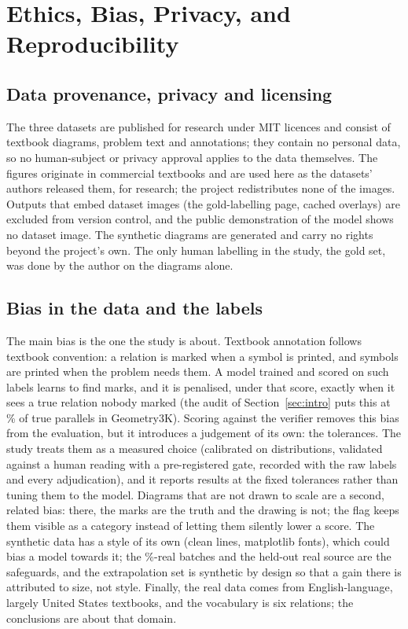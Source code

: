 \section{Ethics, Bias, Privacy, and Reproducibility}
\label{sec:ethics}

\subsection{Data provenance, privacy and licensing}

The three datasets are published for research under MIT licences and consist of textbook diagrams, problem text and annotations; they contain no personal data, so no human-subject or privacy approval applies to the data themselves. The figures originate in commercial textbooks and are used here as the datasets' authors released them, for research; the project redistributes none of the images. Outputs that embed dataset images (the gold-labelling page, cached overlays) are excluded from version control, and the public demonstration of the model shows no dataset image. The synthetic diagrams are generated and carry no rights beyond the project's own. The only human labelling in the study, the gold set, was done by the author on the diagrams alone.

\subsection{Bias in the data and the labels}

The main bias is the one the study is about. Textbook annotation follows textbook convention: a relation is marked when a symbol is printed, and symbols are printed when the problem needs them. A model trained and scored on such labels learns to find marks, and it is penalised, under that score, exactly when it sees a true relation nobody marked (the audit of Section~\ref{sec:intro} puts this at \pctUnmarkedGParallel\% of true parallels in Geometry3K). Scoring against the verifier removes this bias from the evaluation, but it introduces a judgement of its own: the tolerances. The study treats them as a measured choice (calibrated on distributions, validated against a human reading with a pre-registered gate, recorded with the raw labels and every adjudication), and it reports results at the fixed tolerances rather than tuning them to the model. Diagrams that are not drawn to scale are a second, related bias: there, the marks are the truth and the drawing is not; the flag keeps them visible as a category instead of letting them silently lower a score. The synthetic data has a style of its own (clean lines, matplotlib fonts), which could bias a model towards it; the \ftRealFractionPct\%-real batches and the held-out real source are the safeguards, and the extrapolation set is synthetic by design so that a gain there is attributed to size, not style. Finally, the real data comes from English-language, largely United States textbooks, and the vocabulary is six relations; the conclusions are about that domain.


